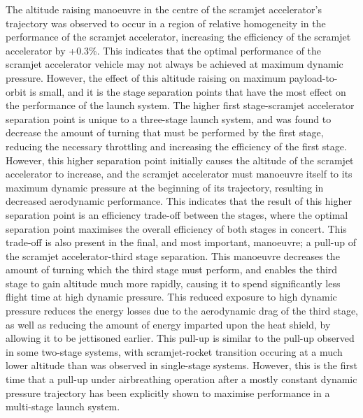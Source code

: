 The altitude raising manoeuvre in the centre of the scramjet accelerator's trajectory was observed to occur in a region of relative homogeneity in the performance of the scramjet accelerator, increasing the efficiency of the scramjet accelerator by +0.3\%. This indicates that the optimal performance of the scramjet accelerator vehicle may not always be achieved at maximum dynamic pressure.  
However, the effect of this altitude raising on maximum payload-to-orbit is small, and it is the stage separation points that have the most effect on the performance of the launch system.
The higher first stage-scramjet accelerator separation point is unique to a three-stage launch system, and was found to decrease the amount of turning that must be performed by the first stage,
reducing the necessary throttling and increasing the efficiency of the first stage. However, this higher separation point initially causes the altitude of the scramjet accelerator to increase, and the scramjet accelerator must manoeuvre itself to its maximum dynamic pressure at the beginning of its trajectory, resulting in decreased aerodynamic performance. This indicates that the result of this higher separation point is an efficiency trade-off between the stages, where the optimal separation point maximises the overall efficiency of both stages in concert. 
 This trade-off is also present in the final, and most important, manoeuvre; a pull-up of the scramjet accelerator-third stage separation. This manoeuvre decreases the amount of turning which the third stage must perform, and enables the third stage to gain altitude much more rapidly, causing it to spend significantly less flight time at high dynamic pressure. 
This reduced exposure to high dynamic pressure reduces the energy losses due to the aerodynamic drag of the third stage, as well as reducing the amount of energy imparted upon the heat shield, by allowing it to be jettisoned earlier. This pull-up is similar to the pull-up observed in some two-stage systems, with scramjet-rocket transition occuring at a much lower altitude than was observed in single-stage systems. However, this is the first time that a pull-up under airbreathing operation after a mostly constant dynamic pressure trajectory has been explicitly shown to maximise performance in a multi-stage launch system.

